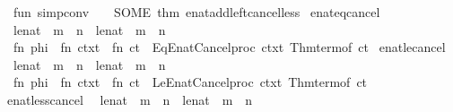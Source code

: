 \begin{isabellebody}
\ \ fun\ simp{\isacharunderscore}conv\ {\isacharunderscore}\ {\isacharunderscore}\ {\isacharequal}\ SOME\ {\isacharat}{\isacharbraceleft}thm\ enat{\isacharunderscore}add{\isacharunderscore}left{\isacharunderscore}cancel{\isacharunderscore}less{\isacharbraceright}\isanewline
{\isacharparenright}\isanewline
{\isacartoucheclose}\isanewline
\isanewline
{}\isamarkupfalse%
\ enat{\isacharunderscore}eq{\isacharunderscore}cancel\isanewline
\ \ {\isacharparenleft}{\isachardoublequoteopen}{\isacharparenleft}l{\isacharcolon}{\isacharcolon}enat{\isacharparenright}\ {\isacharplus}\ m\ {\isacharequal}\ n{\isachardoublequoteclose}\ {\isacharbar}\ {\isachardoublequoteopen}{\isacharparenleft}l{\isacharcolon}{\isacharcolon}enat{\isacharparenright}\ {\isacharequal}\ m\ {\isacharplus}\ n{\isachardoublequoteclose}{\isacharparenright}\ {\isacharequal}\isanewline
\ \ {\isacartoucheopen}fn\ phi\ {\isacharequal}{\isachargreater}\ fn\ ctxt\ {\isacharequal}{\isachargreater}\ fn\ ct\ {\isacharequal}{\isachargreater}\ Eq{\isacharunderscore}Enat{\isacharunderscore}Cancel{\isachardot}proc\ ctxt\ {\isacharparenleft}Thm{\isachardot}term{\isacharunderscore}of\ ct{\isacharparenright}{\isacartoucheclose}\isanewline
\isanewline
{}\isamarkupfalse%
\ enat{\isacharunderscore}le{\isacharunderscore}cancel\isanewline
\ \ {\isacharparenleft}{\isachardoublequoteopen}{\isacharparenleft}l{\isacharcolon}{\isacharcolon}enat{\isacharparenright}\ {\isacharplus}\ m\ {\isasymle}\ n{\isachardoublequoteclose}\ {\isacharbar}\ {\isachardoublequoteopen}{\isacharparenleft}l{\isacharcolon}{\isacharcolon}enat{\isacharparenright}\ {\isasymle}\ m\ {\isacharplus}\ n{\isachardoublequoteclose}{\isacharparenright}\ {\isacharequal}\isanewline
\ \ {\isacartoucheopen}fn\ phi\ {\isacharequal}{\isachargreater}\ fn\ ctxt\ {\isacharequal}{\isachargreater}\ fn\ ct\ {\isacharequal}{\isachargreater}\ Le{\isacharunderscore}Enat{\isacharunderscore}Cancel{\isachardot}proc\ ctxt\ {\isacharparenleft}Thm{\isachardot}term{\isacharunderscore}of\ ct{\isacharparenright}{\isacartoucheclose}\isanewline
\isanewline
{}\isamarkupfalse%
\ enat{\isacharunderscore}less{\isacharunderscore}cancel\isanewline
\ \ {\isacharparenleft}{\isachardoublequoteopen}{\isacharparenleft}l{\isacharcolon}{\isacharcolon}enat{\isacharparenright}\ {\isacharplus}\ m\ {\isacharless}\ n{\isachardoublequoteclose}\ {\isacharbar}\ {\isachardoublequoteopen}{\isacharparenleft}l{\isacharcolon}{\isacharcolon}enat{\isacharparenright}\ {\isacharless}\ m\ {\isacharplus}\ n{\isachardoublequoteclose}{\isacharparenright}\ {\isacharequal}\isanewline

\end{isabellebody}
